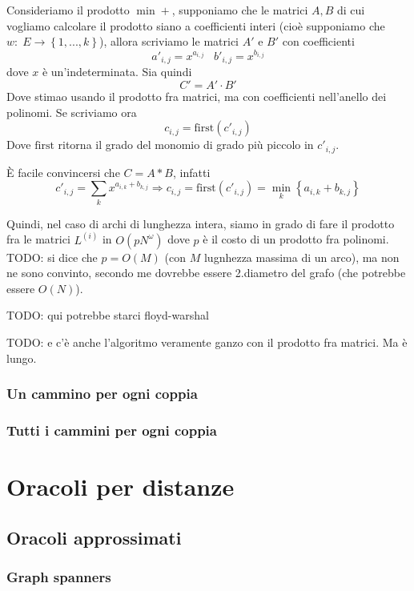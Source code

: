 \documentclass[a4paper,10pt]{amsbook}
\theoremstyle{plain}
\theoremstyle{definition}
\theoremstyle{remark}
\newcommand{\set}[1]{\left\{#1\right\}}
\newcommand{\pa}[1]{\left(#1\right)}
\begin{document}
Consideriamo il prodotto $\min +$, supponiamo che le matrici $A,B$ di
cui vogliamo calcolare il prodotto siano a coefficienti interi (cio\`e
supponiamo che $w:\; E \to \set{1,...,k}$), allora scriviamo le matrici
$A'$ e $B'$ con coefficienti
\[ a'_{i,j} = x ^{a_{i,j}} \;\;\; b'_{i,j} = x ^{b_{i,j}} \]
dove $x$ è un'indeterminata. Sia quindi
\[ C' = A' \cdot B' \]
Dove stimao usando il prodotto fra matrici, ma con coefficienti
nell'anello dei polinomi. Se scriviamo ora 
\[ c _{i,j} = \mathrm{first}\pa{c'_{i,j}} \]
Dove $\mathrm{first}$ ritorna il grado del monomio di grado più
piccolo in $c'_{i,j}$.

È facile convincersi che $C = A * B$, infatti 
\[ c'_{i,j} = \sum _k x^{a_{i,k} + b_{k,j}} \Rightarrow c_{i,j} =
\mathrm{first} \pa{c'_{i,j}} = \min _k \set{ a_{i,k} + b_{k,j} } \]

Quindi, nel caso di archi di lunghezza intera, siamo in grado di fare
il prodotto fra le matrici $L^{(i)}$ in $O\pa{pN^\omega }$ dove $p$ è
il costo di un prodotto fra polinomi. TODO: si dice che $p = O(M)$
(con $M$ lugnhezza massima di un arco), ma non ne sono convinto,
secondo me dovrebbe essere 2.diametro del grafo (che potrebbe essere
$O(N)$).

TODO: qui potrebbe starci floyd-warshal

TODO: e c'è anche l'algoritmo veramente ganzo con il prodotto fra
matrici. Ma è lungo.


\subsection{Un cammino per ogni coppia}

\subsection{Tutti i cammini per ogni coppia}

\chapter{Oracoli per distanze}

\section{Oracoli approssimati}

\subsection{Graph spanners}
\end{document}
